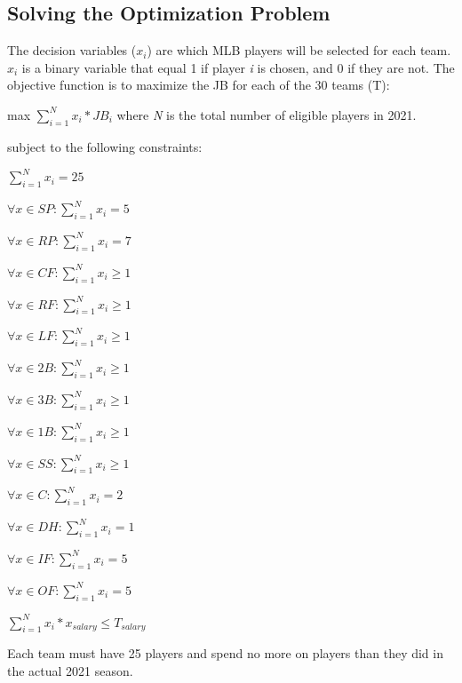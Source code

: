 \documentclass{article}
\begin{document}
\subsection{Solving the Optimization Problem}

The decision variables ($x_{i}$) are which MLB players will be selected for each team. $x_{i}$ is a binary variable that equal 1 if player \emph{i} is chosen, and 0 if they are not. The objective function is to maximize the JB for each of the 30 teams (T):

max $\sum_{i = 1}^{N} x_{i} * JB_{i}$ where \emph{N} is the total number of eligible players in 2021.

subject to the following constraints:

$\sum_{i = 1}^{N} x_{i} = 25$

$\forall x \in SP:  \sum_{i = 1}^{N} x_{i} = 5$ 
 
$\forall x \in RP:  \sum_{i = 1}^{N} x_{i} = 7$ 
 
$\forall x \in CF:  \sum_{i = 1}^{N} x_{i} \geq 1$ 
 
$\forall x \in RF:  \sum_{i = 1}^{N} x_{i} \geq 1$ 
 
$\forall x \in LF:  \sum_{i = 1}^{N} x_{i} \geq 1$ 
 
$\forall x \in 2B:  \sum_{i = 1}^{N} x_{i} \geq 1$ 
 
$\forall x \in 3B:  \sum_{i = 1}^{N} x_{i} \geq 1$ 
 
$\forall x \in 1B:  \sum_{i = 1}^{N} x_{i} \geq 1$ 
 
$\forall x \in SS:  \sum_{i = 1}^{N} x_{i} \geq 1$ 
 
$\forall x \in C:  \sum_{i = 1}^{N} x_{i} = 2$ 

$\forall x \in DH:  \sum_{i = 1}^{N} x_{i} = 1$ 
 
$\forall x \in IF:  \sum_{i = 1}^{N} x_{i} = 5$ 
 
$\forall x \in OF:  \sum_{i = 1}^{N} x_{i} = 5$ 

$\sum_{i = 1}^{N} x_{i} * x_{salary} \leq T_{salary}$

Each team must have 25 players and spend no more on players than they did in the actual 2021 season. 



\end{document}
